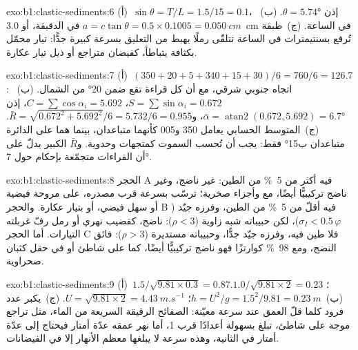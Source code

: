 \begin{solution}{exo:b1:clastic-sediments:6}
(أ)~$\sin\theta = T/L = 1.5/15 = 0.1$، إذن $\theta = \ang{5.74}$. (ب)~$a =
c\tan\theta = 0.5 \times 0.1005 = \qty{0.050}{cm}$ في الدقيقة، أو
\qty{3.0}{cm} في الساعة. (ج)~طبقة تُرفع بسنتيمترات في الساعة تتلقّى رملًا يهبط من التعليق بسرعة كبيرة جدًّا: تيار محمّل بكثافة يتباطأ، كفيضان متراجع أو ذيل تيار عكارة.
\end{solution}

\begin{solution}{exo:b1:clastic-sediments:7}
(أ)~$(350 + 20 + 5 + 340 + 15 + 30)/6 = 760/6 = 126.7$: اتجاه جنوبي شرقي، مع أن كل قراءة تقع ضمن \ang{20} من الشمال. (ب)~$S =
\sum\sin\alpha_i = 0.672$، $C = \sum\cos\alpha_i = 5.692$، إذن $\bar\alpha =
\operatorname{atan2}(0.672, 5.692) = \ang{6.7}$، و$\bar R =
\sqrt{0.672^2 + 5.692^2}/6 = 5.732/6 = 0.955$. (ج)~المتوسط الحسابي يعامل 350 و\num{005} كأنهما متباعدان، بينما هما على الدائرة متباعدان ب\ang{15} فقط: يجب أن تُحسب السموت كمتجهات وحدوية. و$\bar R$ الكبير يدلّ على أن القراءات متجمّعة بإحكام حول \ang{7}.
\end{solution}

\begin{solution}{exo:b1:clastic-sediments:8}
الحجر A فيه أكثر من \qty{5}{\percent} من الطين: غير ناضج، وغير ناضج تركيبيًّا أيضًا، مع  وأجزاء صخرية؛ ترسّب بسرعة قرب مصدره، على مروحة فيضية أو سهل فيضي، أو بتيار عكارة. والحجر B فيه أقلّ من \qty{5}{\percent} من الطين، وفرزه جيّد ($\sigma_I < 0.5\,\varphi$)، لكن حبيباته شبه زاوية ($\rho < 3$): ناضج، كقضيب نهري أو رمل رفّ غربلته التيارات. أما الحجر C فلا طين فيه، وفرزه جيّد جدًّا، وحبيباته مستديرة ($\rho > 3$): فائق النضج، ومع \qty{98}{\percent} كوارتزًا فهو ناضج تركيبيًّا أيضًا، كما على شاطئ أو في حقل كثبان صحراوية.
\end{solution}

\begin{solution}{exo:b1:clastic-sediments:9}
(أ)~$1.5/\sqrt{9.81 \times 0.3} = 0.87$؛ $1.0/\sqrt{9.81 \times 2} = 0.23$.
(ب)~$h = U^2/g = 1.5^2/9.81 = \qty{0.23}{m}$؛ $U = \sqrt{9.81 \times 2} =
\qty{4.43}{m.s^{-1}}$. (ج)~يكبر عدد فرود كلما قلّ العمق عند سرعة معيّنة: الصفائح الرقيقة السريعة من الماء، مثل تراجع موجة على شاطئ، تبلغ بسهولة أعدادًا قرب 1، أما نهر عمقه عدّة أمتار فيحتاج إلى عدّة أمتار في الثانية، وهذه سرعة لا يبلغها معظم الأنهار إلا في الفيضانات.
\end{solution}

